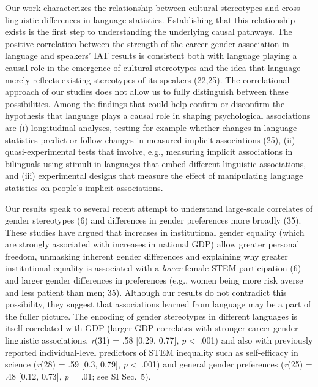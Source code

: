\documentclass[9pt,twocolumn]{pnas-new}
\begin{document}
Our work characterizes the relationship between cultural stereotypes and cross-linguistic differences in language statistics. Establishing that this relationship exists is the first step to understanding the underlying causal pathways. The positive correlation between the strength of the career-gender association in language and speakers' IAT results is consistent both with language playing a causal role in the emergence of cultural stereotypes and the idea that language merely reflects existing stereotypes of its speakers (22,25). The correlational approach of our studies does not allow us to fully distinguish between these possibilities. Among the findings that could help confirm or disconfirm the hypothesis that language plays a causal role in shaping psychological associations are (i) longitudinal analyses, testing for example whether changes in language statistics predict or follow changes in measured implicit associations (25), (ii) quasi-experimental tests that involve, e.g., measuring implicit associations in bilinguals using stimuli in languages that embed different linguistic associations, and (iii) experimental designs that measure the effect of manipulating language statistics on people's implicit associations.

Our results speak to several recent attempt to understand large-scale correlates of gender stereotypes (6) and differences in gender preferences more broadly (35). These studies have argued that increases in institutional gender equality (which are strongly associated with increases in national GDP) allow greater personal freedom, unmasking inherent gender differences and explaining why greater institutional equality is associated with a \textit{lower} female STEM participation (6) and larger gender differences in preferences (e.g., women being more risk averse and less patient than men; 35). Although our results do not contradict this possibility, they suggest that associations learned from language may be a part of the fuller picture. The encoding of gender stereotypes in different languages is itself correlated with GDP (larger GDP correlates with stronger career-gender linguistic associations, \emph{r}(31) = .58 {[}0.29, 0.77{]}, \emph{p} \textless\ .001) and also with previously reported individual-level predictors of STEM inequality such as self-efficacy in science  (\emph{r}(28) = .59 {[}0.3, 0.79{]}, \emph{p} \textless\ .001) and general gender preferences (\emph{r}(25) = .48 {[}0.12, 0.73{]}, \emph{p} = .01; see SI Sec.\ 5). 
\end{document}
